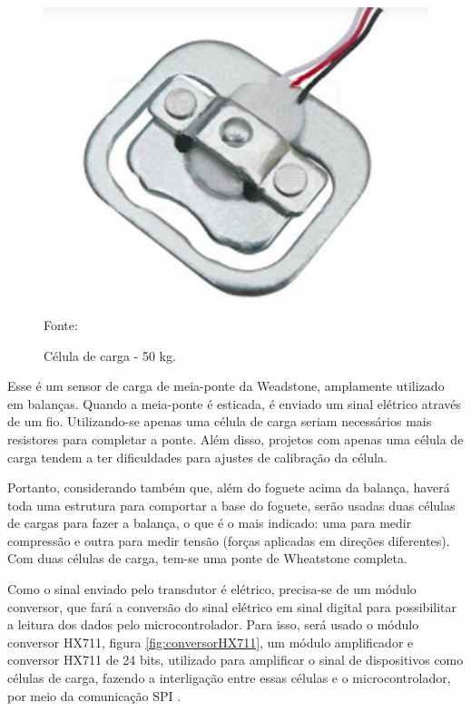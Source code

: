 \begin{figure}[H]
  \centering
  \includegraphics[scale=0.75]{figuras/celula_carga.png}
  \caption{Célula de carga - 50 kg.}
  {\footnotesize Fonte: \cite{figura_celula}} 
  \label{fig:celula_carga}
\end{figure}

Esse é um sensor de carga de meia-ponte da Weadstone, amplamente utilizado em balanças. Quando a meia-ponte é esticada, é enviado um sinal elétrico através de um fio. Utilizando-se apenas uma célula de carga seriam necessários mais resistores para completar a ponte. Além disso, projetos com apenas uma célula de carga tendem a ter dificuldades para ajustes de calibração da célula.

Portanto, considerando também que, além do foguete acima da balança, haverá toda uma estrutura para comportar a base do foguete, serão usadas duas células de cargas para fazer a balança, o que é o mais indicado: uma para medir compressão e outra para medir tensão (forças aplicadas em direções diferentes). Com duas células de carga, tem-se uma ponte de Wheatstone completa.

Como o sinal enviado pelo transdutor é elétrico, precisa-se de um módulo conversor, que fará a conversão do sinal elétrico em sinal digital para possibilitar a leitura dos dados pelo microcontrolador. Para isso, será usado o módulo conversor HX711, figura \ref{fig:conversorHX711}, um módulo amplificador e conversor HX711 de 24 bits, utilizado para amplificar o sinal de dispositivos como células de carga, fazendo a interligação entre essas células e o microcontrolador, por meio da comunicação SPI \cite{avia_HX711}.

